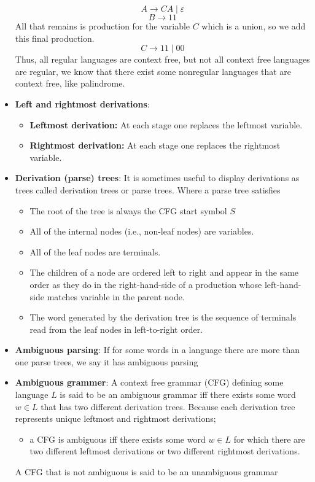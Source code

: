\documentclass{report}
\begin{document}
\begin{itemize}
            \[
                A \rightarrow CA \mid \varepsilon
            \]
            \[
                B \rightarrow 11
            \]
            All that remains is production for the variable \(C\) which is a union, so we add this final production.
            \[
                C \rightarrow 11 \mid 00
            \]
            \bigbreak \noindent 
            Thus, all regular languages are context free, but not all context free languages are regular, we know that there exist some nonregular languages that are context free, like palindrome.
        \item \textbf{Left and rightmost derivations}:
            \begin{itemize}
                \item \textbf{Leftmost derivation:} At each stage one replaces the leftmost variable.
                \item \textbf{Rightmost derivation:} At each stage one replaces the rightmost variable.
            \end{itemize}
        \item \textbf{Derivation (parse) trees}: It is sometimes useful to display derivations as trees called derivation trees or parse trees. Where a parse tree satisfies
            \begin{itemize}
                \item The root of the tree is always the CFG start symbol $S$
                \item All of the internal nodes (i.e., non-leaf nodes) are variables.
                \item All of the leaf nodes are terminals.
                \item The children of a node are ordered left to right and appear in the same order as they do in the right-hand-side of a production whose left-hand-side matches variable in the parent node.
                \item The word generated by the derivation tree is the sequence of terminals read from the leaf nodes in left-to-right order.
            \end{itemize}
        \item \textbf{Ambiguous parsing}: If for some words in a language there are more than one parse trees, we say it has ambiguous parsing
        \item \textbf{Ambiguous grammer}: A context free grammar (CFG) defining some language $L$ is said to be an ambiguous grammar iff there exists some word $w\in L$ that has two different derivation trees.
            \bigbreak \noindent 
            Because each derivation tree represents unique leftmost and rightmost derivations;
            \begin{itemize}
                \item a CFG is ambiguous iff there exists some word $w\in L$ for which there are two different leftmost derivations or two different rightmost derivations.
            \end{itemize}
        A CFG that is not ambiguous is said to be an unambiguous grammar
    \end{itemize}
\end{document}
